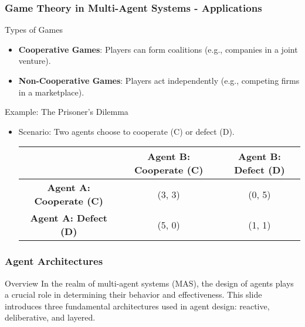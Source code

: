 \documentclass[aspectratio=169]{beamer}
\begin{document}
\begin{frame}[fragile]
    \frametitle{Game Theory in Multi-Agent Systems - Applications}
    \begin{block}{Types of Games}
        \begin{itemize}
            \item \textbf{Cooperative Games}: Players can form coalitions (e.g., companies in a joint venture).
            \item \textbf{Non-Cooperative Games}: Players act independently (e.g., competing firms in a marketplace).
        \end{itemize}
    \end{block}

    \begin{block}{Example: The Prisoner's Dilemma}
        \begin{itemize}
            \item Scenario: Two agents choose to cooperate (C) or defect (D).
            \begin{center}
            \begin{tabular}{|c|c|c|}
                \hline
                & \textbf{Agent B: Cooperate (C)} & \textbf{Agent B: Defect (D)} \\
                \hline
                \textbf{Agent A: Cooperate (C)} & (3, 3) & (0, 5) \\
                \hline
                \textbf{Agent A: Defect (D)} & (5, 0) & (1, 1) \\
                \hline
            \end{tabular}
            \end{center}
        \end{itemize}
    \end{block}
\end{frame}

\begin{frame}[fragile]
    \frametitle{Agent Architectures}
    \begin{block}{Overview}
        In the realm of multi-agent systems (MAS), the design of agents plays a crucial role in determining their behavior and effectiveness. This slide introduces three fundamental architectures used in agent design: reactive, deliberative, and layered.
    \end{block}
\end{frame}
\end{document}
